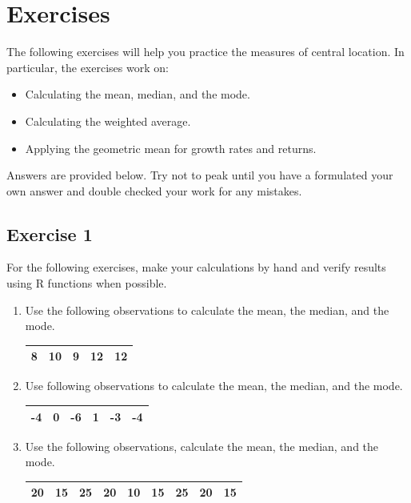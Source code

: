 \documentclass[
  letterpaper,
  DIV=11,
  numbers=noendperiod]{scrreprt}
\begin{document}
\hypertarget{exercises-2}{%
\section{Exercises}\label{exercises-2}}

The following exercises will help you practice the measures of central
location. In particular, the exercises work on:

\begin{itemize}
\item
  Calculating the mean, median, and the mode.
\item
  Calculating the weighted average.
\item
  Applying the geometric mean for growth rates and returns.
\end{itemize}

Answers are provided below. Try not to peak until you have a formulated
your own answer and double checked your work for any mistakes.

\hypertarget{exercise-1-4}{%
\subsection*{Exercise 1}\label{exercise-1-4}}

For the following exercises, make your calculations by hand and verify
results using R functions when possible.

\begin{enumerate}
\def\labelenumi{\arabic{enumi}.}
\item
  Use the following observations to calculate the mean, the median, and
  the mode.

  \begin{longtable}[]{@{}ccccc@{}}
  \toprule()
  \endhead
  8 & 10 & 9 & 12 & 12 \\
  \bottomrule()
  \end{longtable}
\item
  Use following observations to calculate the mean, the median, and the
  mode.

  \begin{longtable}[]{@{}cccccc@{}}
  \toprule()
  \endhead
  -4 & 0 & -6 & 1 & -3 & -4 \\
  \bottomrule()
  \end{longtable}
\item
  Use the following observations, calculate the mean, the median, and
  the mode.

  \begin{longtable}[]{@{}ccccccccc@{}}
  \toprule()
  \endhead
  20 & 15 & 25 & 20 & 10 & 15 & 25 & 20 & 15 \\
  \bottomrule()
  \end{longtable}
\end{enumerate}
\end{document}
